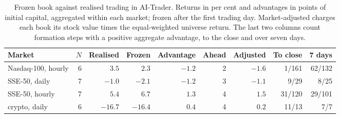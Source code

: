 \begin{table}[ht]
\centering\footnotesize
\caption{Frozen book against realised trading in AI-Trader. Returns in per cent and advantages in points of initial capital, aggregated within each market; frozen after the first trading day. Market-adjusted charges each book its stock value times the equal-weighted universe return. The last two columns count formation steps with a positive aggregate advantage, to the close and over seven days.}
\label{tab:aitrader}
\setlength{\tabcolsep}{3pt}
\begin{tabular}{lrrrrrrrr}
\toprule
Market & $N$ & Realised & Frozen & Advantage & Ahead & Adjusted & To close & 7 days \\
\midrule
Nasdaq-100, hourly & 6 & $3.5$ & $2.3$ & $\ensuremath{-}1.2$ & 2 & $\ensuremath{-}1.6$ & 1/161 & 62/132 \\
SSE-50, daily & 7 & $\ensuremath{-}1.0$ & $\ensuremath{-}2.1$ & $\ensuremath{-}1.2$ & 3 & $\ensuremath{-}1.1$ & 9/29 & 8/25 \\
SSE-50, hourly & 7 & $5.4$ & $6.7$ & $1.3$ & 4 & $1.5$ & 31/120 & 29/101 \\
crypto, daily & 6 & $\ensuremath{-}16.7$ & $\ensuremath{-}16.4$ & $0.4$ & 4 & $0.2$ & 11/13 & 7/7 \\
\bottomrule
\end{tabular}
\end{table}
